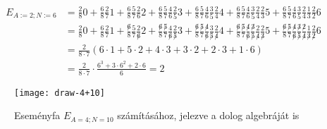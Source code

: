 \documentclass{article}
\newcommand{\parenthesed}[1]{\left(#1\right)}
\begin{document}
	\begin{align*}
		E_{A:=2; N:=6} &= \frac{2}{8}0 + \frac{6}{8}\frac{2}{7}1 + \frac{6}{8}\frac{5}{7}\frac{2}{6}2 + \frac{6}{8}\frac{5}{7}\frac{4}{6}\frac{2}{5}3 + \frac{6}{8}\frac{5}{7}\frac{4}{6}\frac{3}{5}\frac{2}{4}4 + \frac{6}{8}\frac{5}{7}\frac{4}{6}\frac{3}{5}\frac{2}{4}\frac{2}{3}5 + \frac{6}{8}\frac{5}{7}\frac{4}{6}\frac{3}{5}\frac{2}{4}\frac{1}{3}\frac{2}{2}6\\
		  &= \frac{2}{8}0 + \frac{6}{8}\frac{2}{7}1 + \frac{\not6}{8}\frac{5}{7}\frac{2}{\not6}2 + \frac{\not6}{8}\frac{\not5}{7}\frac{4}{\not6}\frac{2}{\not5}3 + \frac{\not6}{8}\frac{\not5}{7}\frac{\not4}{\not6}\frac{3}{\not5}\frac{2}{\not4}4 + \frac{\not6}{8}\frac{\not5}{7}\frac{\not4}{\not6}\frac{\not3}{\not5}\frac{2}{\not4}\frac{2}{\not3}5 + \frac{\not6}{8}\frac{\not5}{7}\frac{\not4}{\not6}\frac{\not3}{\not5}\frac{\not2}{\not4}\frac{1}{\not3}\frac{2}{\not2}6\\
		  &= \frac2{8\cdot7}\parenthesed{6\cdot1 + 5\cdot2 + 4\cdot3 + 3\cdot2 + 2\cdot3 + 1\cdot6}\\
		  &= \frac2{8\cdot7}\cdot\frac{6^3+3\cdot6^2+2\cdot6}6 = 2
	\end{align*}


	\begin{figure}[H]
		\caption*{Eseményfa $E_{A=4;N=10}$ számításához, jelezve a dolog algebráját is}
		\centering
		\texttt{[image: draw-4+10]}
	\end{figure}
\end{document}
